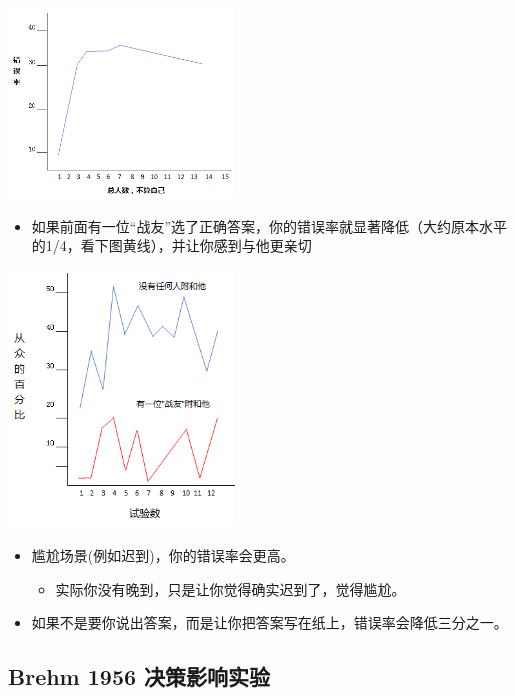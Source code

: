 \includegraphics[width=6cm]{Asch3Screenshot_2022-07-08_2013411.png}

\begin{itemize}
\tightlist
\item
  如果前面有一位``战友''选了正确答案，你的错误率就显著降低（大约原本水平的1/4，看下图黄线），并让你感到与他更亲切
\end{itemize}

\includegraphics[width=6cm]{Asch4Screenshot_2022-07-08_2015021.png}

\begin{itemize}
\tightlist
\item
  尴尬场景(例如迟到)，你的错误率会更高。

  \begin{itemize}
  \tightlist
  \item
    实际你没有晚到，只是让你觉得确实迟到了，觉得尴尬。
  \end{itemize}
\item
  如果不是要你说出答案，而是让你把答案写在纸上，错误率会降低三分之一。
\end{itemize}

\hypertarget{brehm-1956-ux51b3ux7b56ux5f71ux54cdux5b9eux9a8c}{%
\subsection{Brehm 1956
决策影响实验}\label{brehm-1956-ux51b3ux7b56ux5f71ux54cdux5b9eux9a8c}}

